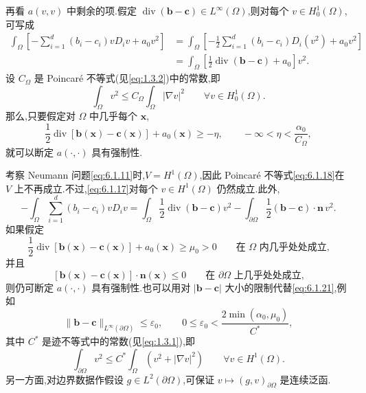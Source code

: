 再看 \(a(v,v)\) 中剩余的项.假定 \(\operatorname{div}(\boldsymbol{b}-\boldsymbol{c})\in L^\infty(\Omega)\),则对每个 \(v\in H_0^1(\Omega)\),可写成
\[
  \begin{aligned}
    \int_\Omega\left[-\sum_{i=1}^d(b_i-c_i)vD_iv+a_0v^2\right]
    &=\int_\Omega\left[-\frac12\sum_{i=1}^d(b_i-c_i)D_i(v^2)+a_0v^2\right]\\
    &=\int_\Omega\left[\frac12\operatorname{div}(\boldsymbol{b}-\boldsymbol{c})+a_0\right]v^2.
  \end{aligned}
\]
设 \(C_\Omega\) 是 Poincaré 不等式(见\eqref{eq:1.3.2})中的常数,即
\begin{equation}\label{eq:6.1.18}
  \int_\Omega v^2\le C_\Omega\int_\Omega|\nabla v|^2
    \qquad\forall v\in H_0^1(\Omega).
\end{equation}
那么,只要假定对 \(\Omega\) 中几乎每个 \(\boldsymbol{x}\),
\begin{equation}\label{eq:6.1.19}
  \frac12\operatorname{div}[\boldsymbol{b}(\boldsymbol{x})-\boldsymbol{c}(\boldsymbol{x})]+a_0(\boldsymbol{x})
    \ge-\eta,\qquad -\infty<\eta<\frac{\alpha_0}{C_\Omega},
\end{equation}
就可以断定 \(a(\cdot,\cdot)\) 具有强制性.

考察 Neumann 问题\eqref{eq:6.1.11}时,\(V=H^1(\Omega)\),因此 Poincaré 不等式\eqref{eq:6.1.18}在 \(V\) 上不再成立.不过,\eqref{eq:6.1.17}对每个 \(v\in H^1(\Omega)\) 仍然成立.此外,
\[
  -\int_\Omega\sum_{i=1}^d(b_i-c_i)vD_iv
    =\int_\Omega\frac12\operatorname{div}(\boldsymbol{b}-\boldsymbol{c})v^2
     -\int_{\partial\Omega}\frac12(\boldsymbol{b}-\boldsymbol{c})\cdot\boldsymbol{n}\,v^2.
\]
如果假定
\begin{equation}\label{eq:6.1.20}
  \frac12\operatorname{div}[\boldsymbol{b}(\boldsymbol{x})-\boldsymbol{c}(\boldsymbol{x})]+a_0(\boldsymbol{x})
  \ge\mu_0>0
  \qquad\text{在 \(\Omega\) 内几乎处处成立,}
\end{equation}
并且
\begin{equation}\label{eq:6.1.21}
  [\boldsymbol{b}(\boldsymbol{x})-\boldsymbol{c}(\boldsymbol{x})]\cdot\boldsymbol{n}(\boldsymbol{x})\le0
  \qquad\text{在 \(\partial\Omega\) 上几乎处处成立,}
\end{equation}
则仍可断定 \(a(\cdot,\cdot)\) 具有强制性.也可以用对 \(|\boldsymbol{b}-\boldsymbol{c}|\) 大小的限制代替\eqref{eq:6.1.21},例如
\begin{equation}\label{eq:6.1.22}
  \|\boldsymbol{b}-\boldsymbol{c}\|_{L^\infty(\partial\Omega)}\le\varepsilon_0,\qquad
  0\le\varepsilon_0<\frac{2\min(\alpha_0,\mu_0)}{C^*},
\end{equation}
其中 \(C^*\) 是迹不等式中的常数(见\eqref{eq:1.3.1}),即
\[
  \int_{\partial\Omega}v^2\le C^*\int_\Omega(v^2+|\nabla v|^2)
  \qquad\forall v\in H^1(\Omega).
\]
另一方面,对边界数据作假设 \(g\in L^2(\partial\Omega)\),可保证 \(v\mapsto(g,v)_{\partial\Omega}\) 是连续泛函.

